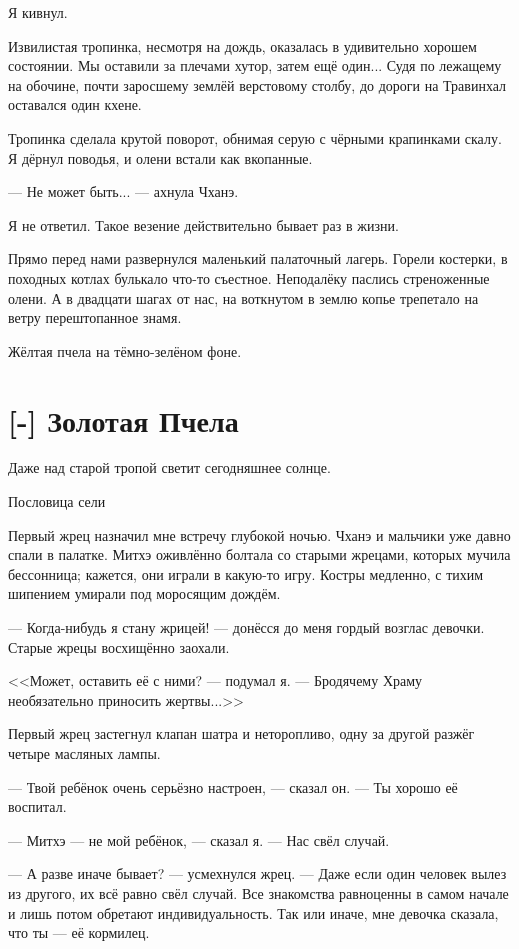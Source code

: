 Я кивнул.

Извилистая тропинка, несмотря на дождь, оказалась в удивительно хорошем состоянии.
Мы оставили за плечами хутор, затем ещё один...
Судя по лежащему на обочине, почти заросшему землёй верстовому столбу, до дороги на Травинхал оставался один кхене.

Тропинка сделала крутой поворот, обнимая серую с чёрными крапинками скалу.
Я дёрнул поводья, и олени встали как вкопанные.

--- Не может быть... --- ахнула Чханэ.

Я не ответил.
Такое везение действительно бывает раз в жизни.

Прямо перед нами развернулся маленький палаточный лагерь.
Горели костерки, в походных котлах булькало что-то съестное.
Неподалёку паслись стреноженные олени.
А в двадцати шагах от нас, на воткнутом в землю копье трепетало на ветру перештопанное знамя.

Жёлтая пчела на тёмно-зелёном фоне.

\section{[-] Золотая Пчела}

\epigraph
{Даже над старой тропой светит сегодняшнее солнце.}
{Пословица сели}

Первый жрец назначил мне встречу глубокой ночью.
Чханэ и мальчики уже давно спали в палатке.
Митхэ оживлённо болтала со старыми жрецами, которых мучила бессонница;
кажется, они играли в какую-то игру.
Костры медленно, с тихим шипением умирали под моросящим дождём.

--- Когда-нибудь я стану жрицей! --- донёсся до меня гордый возглас девочки.
Старые жрецы восхищённо заохали.

<<Может, оставить её с ними? --- подумал я.
--- Бродячему Храму необязательно приносить жертвы...>>

Первый жрец застегнул клапан шатра и неторопливо, одну за другой разжёг четыре масляных лампы.

--- Твой ребёнок очень серьёзно настроен, --- сказал он.
--- Ты хорошо её воспитал.

--- Митхэ --- не мой ребёнок, --- сказал я.
--- Нас свёл случай.

--- А разве иначе бывает? --- усмехнулся жрец.
--- Даже если один человек вылез из другого, их всё равно свёл случай.
Все знакомства равноценны в самом начале и лишь потом обретают индивидуальность.
Так или иначе, мне девочка сказала, что ты --- её кормилец.

